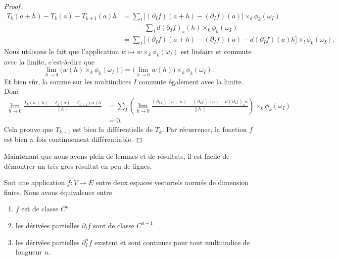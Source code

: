 \begin{proof}
    \begin{subequations}
        \begin{align}
            T_k(a+h)-T_k(a)-T_{k+1}(a)h&=\sum_I\big[ (\partial_If)(a+h)-(\partial_If)(a) \big]\times_k\phi_k(\omega_I)\\
                                        &\qquad-\sum_Id(\partial_If)_a(h)\times_k\phi_k(\omega_I)\\
                                        &=\sum_I\big[ (\partial_If)(a+h)-(\partial_If)(a)-d(\partial_If)(a)h \big]\times_l\phi_k(\omega_I).
        \end{align}
    \end{subequations}
    Nous utilisons le fait que l'application \( w\mapsto w\times_k\phi_k(\omega_I)\) est linéaire et commute avec la limite, c'est-à-dire que
    \begin{equation}
        \lim_{h\to 0} \big( w(h)\times_k\phi_k(\omega_I) \big)=\big( \lim_{h\to 0} w(h) \big)\times_k\phi_k(\omega_I).
    \end{equation}
    Et bien sûr, la somme sur les multiindices \( I\) commute également avec la limite. Donc
    \begin{subequations}
        \begin{align}
        \lim_{h\to 0} \frac{ T_k(a+h)-T_k(a)-T_{k+1}(a)h }{ \| h \| }&=\sum_I\left( \lim_{h\to 0} \frac{ (\partial_If)(a+h)-(\partial_If)(a)-d(\partial_If)_ah }{ \| h \| } \right)\times_k\phi_k(\omega_I)\\
        &=0.
        \end{align}
    \end{subequations}
    Cela prouve que \( T_{k+1}\) est bien la différentielle de \( T_k\). Par récurrence, la fonction \( f\) est bien \( n\) fois continuement différentiable.
\end{proof}

Maintenant que nous avons plein de lemmes et de résultats, il est facile de démontrer un très gros résultat en peu de lignes.

\begin{theorem}     \label{THOooPZTAooTASBhZ}
    Soit une application \( f\colon V\to E\) entre deux espaces vectoriels normés de dimension finies. Nous avons équivalence entre
    \begin{enumerate}
        \item       \label{ITEMooBOWTooXgxhpS}
            \( f\) est de classe \( C^n\)
        \item       \label{ITEMooPVZHooHihSRD}
            les dérivées partielles \( \partial_if\) sont de classe \( C^{n-1}\)
        \item       \label{ITEMooVBQMooBleazN}
            les dérivées partielles \( \partial^n_If\) existent et sont continues pour tout multiiindice de longueur \( n\).
    \end{enumerate}
\end{theorem}

